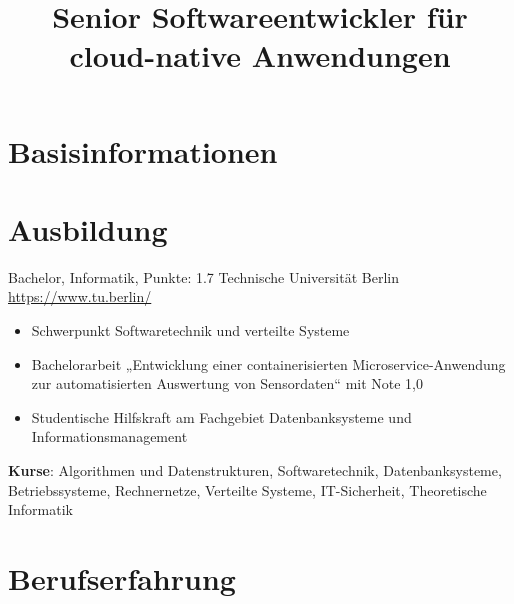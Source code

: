 \documentclass[a4paper, serif, 10pt]{moderncv}
\title{Senior Softwareentwickler für cloud-native Anwendungen}
\begin{document}
\maketitle

\section{Basisinformationen}

\section{Ausbildung}

        {Bachelor, Informatik, Punkte: 1.7}
        {Technische Universität Berlin}
        {\url{https://www.tu.berlin/}}
        {}
        {\begin{itemize}
\item Schwerpunkt Softwaretechnik und verteilte Systeme
\item Bachelorarbeit „Entwicklung einer containerisierten Microservice-Anwendung zur automatisierten Auswertung von Sensordaten“ mit Note 1,0
\item Studentische Hilfskraft am Fachgebiet Datenbanksysteme und Informationsmanagement
\end{itemize}
\textbf{Kurse}: Algorithmen und Datenstrukturen, Softwaretechnik, Datenbanksysteme, Betriebssysteme, Rechnernetze, Verteilte Systeme, IT-Sicherheit, Theoretische Informatik}
\section{Berufserfahrung}
\end{document}
